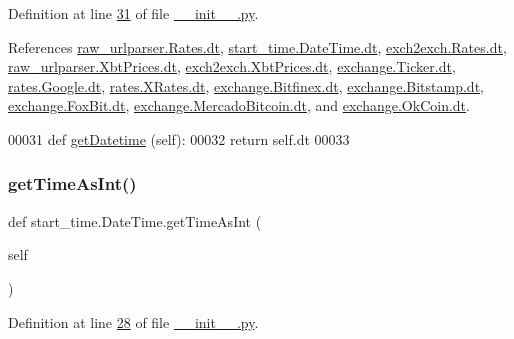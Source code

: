 Definition at line \hyperlink{start__time_2____init_____8py_source_l00031}{31} of file \hyperlink{start__time_2____init_____8py_source}{\+\_\+\+\_\+init\+\_\+\+\_\+.\+py}.



References \hyperlink{raw__urlparser_8py_source_l00024}{raw\+\_\+urlparser.\+Rates.\+dt}, \hyperlink{start__time_2____init_____8py_source_l00024}{start\+\_\+time.\+Date\+Time.\+dt}, \hyperlink{exch2exch_8py_source_l00028}{exch2exch.\+Rates.\+dt}, \hyperlink{raw__urlparser_8py_source_l00053}{raw\+\_\+urlparser.\+Xbt\+Prices.\+dt}, \hyperlink{exch2exch_8py_source_l00057}{exch2exch.\+Xbt\+Prices.\+dt}, \hyperlink{exchange_8py_source_l00059}{exchange.\+Ticker.\+dt}, \hyperlink{rates_8py_source_l00089}{rates.\+Google.\+dt}, \hyperlink{rates_8py_source_l00145}{rates.\+X\+Rates.\+dt}, \hyperlink{exchange_8py_source_l00437}{exchange.\+Bitfinex.\+dt}, \hyperlink{exchange_8py_source_l00509}{exchange.\+Bitstamp.\+dt}, \hyperlink{exchange_8py_source_l00573}{exchange.\+Fox\+Bit.\+dt}, \hyperlink{exchange_8py_source_l00649}{exchange.\+Mercado\+Bitcoin.\+dt}, and \hyperlink{exchange_8py_source_l00714}{exchange.\+Ok\+Coin.\+dt}.


\begin{DoxyCode}
00031     \textcolor{keyword}{def }\hyperlink{namespacestart__time_a52171f611eeff20ff03fd88c834220b0}{getDatetime} (self):
00032         \textcolor{keywordflow}{return} self.dt
00033     
\end{DoxyCode}
\mbox{\label{classstart__time_1_1_date_time_a06ea03ca31a47c26c12dbaaefb6a9c6d}} 
\subsubsection{\texorpdfstring{get\+Time\+As\+Int()}{getTimeAsInt()}}
{\footnotesize\ttfamily def start\+\_\+time.\+Date\+Time.\+get\+Time\+As\+Int (\begin{DoxyParamCaption}\item[{}]{self }\end{DoxyParamCaption})}



Definition at line \hyperlink{start__time_2____init_____8py_source_l00028}{28} of file \hyperlink{start__time_2____init_____8py_source}{\+\_\+\+\_\+init\+\_\+\+\_\+.\+py}.



